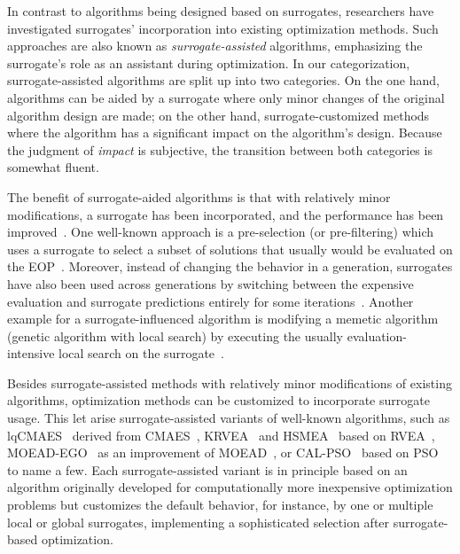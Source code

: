 \documentclass[journal]{IEEEtran}
\begin{document}
In contrast to algorithms being designed based on surrogates, researchers have investigated surrogates' incorporation into existing optimization methods. Such approaches are also known as \emph{surrogate-assisted} algorithms, emphasizing the surrogate's role as an assistant during optimization.
In our categorization, surrogate-assisted algorithms are split up into two categories. On the one hand, algorithms can be aided by a surrogate where only minor changes of the original algorithm design are made; on the other hand, surrogate-customized methods where the algorithm has a significant impact on the algorithm's design.
Because the judgment of \emph{impact} is subjective, the transition between both categories is somewhat fluent.


The benefit of surrogate-aided algorithms is that with relatively minor modifications, a surrogate has been incorporated, and the performance has been improved~\cite{2011-jin-surrogate-recent}. One well-known approach is a pre-selection (or pre-filtering) which uses a surrogate to select a subset of solutions that usually would be evaluated on the EOP~\cite{2002-emmerich-preselection}.
Moreover, instead of changing the behavior in a generation, surrogates have also been used across generations by switching between the expensive evaluation and surrogate predictions entirely for some iterations~\cite{2002-jin-approximate-fitness,1998-ratle-surr-ga}.
Another example for a surrogate-influenced algorithm is modifying a memetic algorithm (genetic algorithm with local search) by executing the usually evaluation-intensive local search on the surrogate~\cite{2007-zhou-local-vs-global}.


Besides surrogate-assisted methods with relatively minor modifications of existing algorithms, optimization methods can be customized to incorporate surrogate usage.
This let arise surrogate-assisted variants of well-known algorithms, such as lqCMAES~\cite{2019-hansen-lqcmaes} derived from CMAES~\cite{2001-hansen-cmaes}, KRVEA~\cite{2016-chugh-krvea} and HSMEA~\cite{2019-habib-hsmea} based on RVEA~\cite{2016-cheng-rvea}, MOEAD-EGO~\cite{2010-zhang-moead-ego} as an improvement of MOEAD~\cite{2007-zhang-moead}, or CAL-PSO~\cite{2017-wang-pso-committee-active-learning} based on PSO~\cite{1995-kennedy-pso} to name a few. Each surrogate-assisted variant is in principle based on an algorithm originally developed for computationally more inexpensive optimization problems but customizes the default behavior, for instance, by one or multiple local or global surrogates, implementing a sophisticated selection after surrogate-based optimization.
\end{document}
